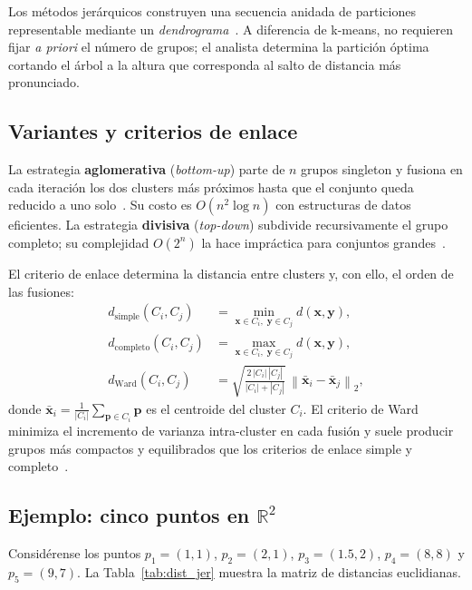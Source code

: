 Los métodos jerárquicos construyen una secuencia anidada de particiones representable mediante un \emph{dendrograma}~\cite{jain1999clustering}. A diferencia de k-means, no requieren fijar \textit{a priori} el número de grupos; el analista determina la partición óptima cortando el árbol a la altura que corresponda al salto de distancia más pronunciado.

\subsection*{Variantes y criterios de enlace}

La estrategia \textbf{aglomerativa} (\textit{bottom-up}) parte de $n$ grupos singleton y fusiona en cada iteración los dos clusters más próximos hasta que el conjunto queda reducido a uno solo~\cite{murtagh2012hierarchical}. Su costo es $O(n^2 \log n)$ con estructuras de datos eficientes. La estrategia \textbf{divisiva} (\textit{top-down}) subdivide recursivamente el grupo completo; su complejidad $O(2^n)$ la hace impráctica para conjuntos grandes~\cite{jain1999clustering}.

El criterio de enlace determina la distancia entre clusters y, con ello, el orden de las fusiones:
\begin{align}
d_{\mathrm{simple}}(C_i, C_j) &= \min_{\mathbf{x}\in C_i,\;\mathbf{y}\in C_j} d(\mathbf{x},\mathbf{y}), \label{eq:single_link}\\
d_{\mathrm{completo}}(C_i, C_j) &= \max_{\mathbf{x}\in C_i,\;\mathbf{y}\in C_j} d(\mathbf{x},\mathbf{y}), \label{eq:complete_link}\\
d_{\mathrm{Ward}}(C_i, C_j) &= \sqrt{\frac{2\,|C_i|\,|C_j|}{|C_i|+|C_j|}}\,\left\|\bar{\mathbf{x}}_i - \bar{\mathbf{x}}_j\right\|_2, \label{eq:ward_link}
\end{align}
donde $\bar{\mathbf{x}}_i = \frac{1}{|C_i|}\sum_{\mathbf{p}\in C_i}\mathbf{p}$ es el centroide del cluster $C_i$. El criterio de Ward~\cite{ward1963hierarchical} minimiza el incremento de varianza intra-cluster en cada fusión y suele producir grupos más compactos y equilibrados que los criterios de enlace simple y completo~\cite{murtagh2012hierarchical}.

\subsection*{Ejemplo: cinco puntos en $\mathbb{R}^2$}

Considérense los puntos $p_1=(1,1)$, $p_2=(2,1)$, $p_3=(1.5,2)$, $p_4=(8,8)$ y $p_5=(9,7)$. La Tabla~\ref{tab:dist_jer} muestra la matriz de distancias euclidianas.

